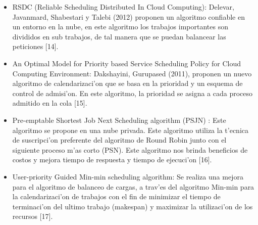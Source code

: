 \begin{itemize}
\item RSDC (Reliable Scheduling Distributed In Cloud Computing): Delevar, Javanmard, Shabestari y Talebi (2012) proponen un algoritmo confiable en un entorno en la nube, en este algoritmo los trabajos importantes son divididos en sub trabajos, de tal manera que se puedan balancear las peticiones [14].


\item An Optimal Model for Priority based Service Scheduling Policy for Cloud Computing Environment: Dakshayini, Gurupased (2011), proponen un nuevo algoritmo de calendarizaci'on que se basa en la prioridad y un esquema de control de admisi'on. En este algoritmo, la prioridad se asigna a cada proceso admitido en la cola [15]. 


\item Pre-emptable Shortest Job Next Scheduling algorithm (PSJN) :  Este algoritmo se propone en una nube privada. Este algoritmo utiliza la t'ecnica de suscripci'on preferente del algoritmo de Round Robin junto con el siguiente proceso m'as corto (PSN). Este algoritmo nos brinda beneficios de costos y mejora tiempo de respuesta y tiempo de ejecuci'on [16]. 


\item User-priority Guided Min-min scheduling algorithm: Se realiza una mejora para el algoritmo de balanceo de cargas, a trav'es del algoritmo Min-min para la calendarizaci'on de trabajos con el fin de minimizar el tiempo de terminaci'on del ultimo trabajo (makespan) y maximizar la utilizaci'on de los recursos [17]. 
\end{itemize}




